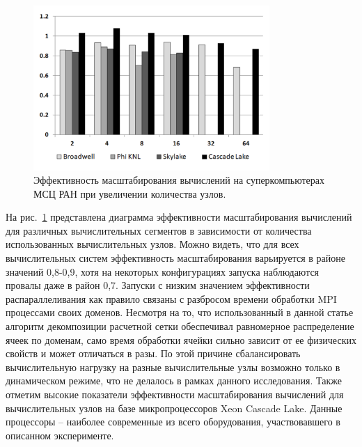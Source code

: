 \begin{figure}[ht]
\centering
\includegraphics[width=0.8\textwidth]{pics/text_2_scaling/scaling.pdf}
\caption{Эффективность масштабирования вычислений на суперкомпьютерах МСЦ РАН при увеличении количества узлов.}
\label{fig:text_2_scaling_eff}
\end{figure}

На рис.~\ref{fig:text_2_scaling_eff} представлена диаграмма эффективности масштабирования вычислений для различных вычислительных сегментов в зависимости от количества использованных вычислительных узлов.
Можно видеть, что для всех вычислительных систем эффективность масштабирования варьируется в районе значений 0,8-0,9, хотя на некоторых конфигурациях запуска наблюдаются провалы даже в район 0,7.
Запуски с низким значением эффективности распараллеливания как правило связаны с разбросом времени обработки MPI процессами своих доменов.
Несмотря на то, что использованный в данной статье алгоритм декомпозиции расчетной сетки обеспечивал равномерное распределение ячеек по доменам, само время обработки ячейки сильно зависит от ее физических свойств и может отличаться в разы.
По этой причине сбалансировать вычислительную нагрузку на разные вычислительные узлы возможно только в динамическом режиме, что не делалось в рамках данного исследования.
Также отметим высокие показатели эффективности масштабирования вычислений для вычислительных узлов на базе микропроцессоров Xeon Cascade Lake.
Данные процессоры -- наиболее современные из всего оборудования, участвовавшего в описанном эксперименте.
